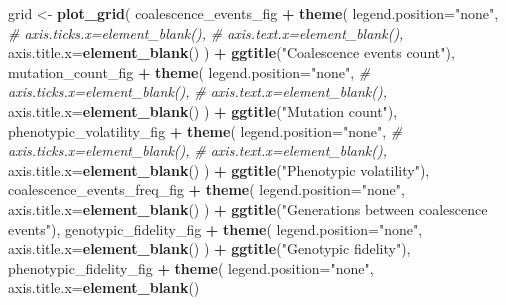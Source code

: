 \documentclass[]{book}
\newenvironment{Shaded}{\begin{snugshade}}{\end{snugshade}}
\newcommand{\CommentTok}[1]{\textcolor[rgb]{0.56,0.35,0.01}{\textit{#1}}}
\newcommand{\DataTypeTok}[1]{\textcolor[rgb]{0.13,0.29,0.53}{#1}}
\newcommand{\KeywordTok}[1]{\textcolor[rgb]{0.13,0.29,0.53}{\textbf{#1}}}
\newcommand{\NormalTok}[1]{#1}
\newcommand{\OperatorTok}[1]{\textcolor[rgb]{0.81,0.36,0.00}{\textbf{#1}}}
\newcommand{\StringTok}[1]{\textcolor[rgb]{0.31,0.60,0.02}{#1}}
\begin{document}
\begin{Shaded}
\begin{Highlighting}[]
\NormalTok{grid <-}\StringTok{ }\KeywordTok{plot_grid}\NormalTok{(}
\NormalTok{  coalescence_events_fig }\OperatorTok{+}
\StringTok{    }\KeywordTok{theme}\NormalTok{(}
      \DataTypeTok{legend.position=}\StringTok{"none"}\NormalTok{,}
      \CommentTok{# axis.ticks.x=element_blank(),}
      \CommentTok{# axis.text.x=element_blank(),}
      \DataTypeTok{axis.title.x=}\KeywordTok{element_blank}\NormalTok{()}
\NormalTok{    ) }\OperatorTok{+}
\StringTok{    }\KeywordTok{ggtitle}\NormalTok{(}\StringTok{"Coalescence events count"}\NormalTok{),}
\NormalTok{  mutation_count_fig }\OperatorTok{+}
\StringTok{    }\KeywordTok{theme}\NormalTok{(}
      \DataTypeTok{legend.position=}\StringTok{"none"}\NormalTok{,}
      \CommentTok{# axis.ticks.x=element_blank(),}
      \CommentTok{# axis.text.x=element_blank(),}
      \DataTypeTok{axis.title.x=}\KeywordTok{element_blank}\NormalTok{()}
\NormalTok{    ) }\OperatorTok{+}
\StringTok{    }\KeywordTok{ggtitle}\NormalTok{(}\StringTok{"Mutation count"}\NormalTok{),}
\NormalTok{  phenotypic_volatility_fig }\OperatorTok{+}
\StringTok{    }\KeywordTok{theme}\NormalTok{(}
      \DataTypeTok{legend.position=}\StringTok{"none"}\NormalTok{,}
      \CommentTok{# axis.ticks.x=element_blank(),}
      \CommentTok{# axis.text.x=element_blank(),}
      \DataTypeTok{axis.title.x=}\KeywordTok{element_blank}\NormalTok{()}
\NormalTok{    ) }\OperatorTok{+}
\StringTok{    }\KeywordTok{ggtitle}\NormalTok{(}\StringTok{"Phenotypic volatility"}\NormalTok{),}
\NormalTok{  coalescence_events_freq_fig }\OperatorTok{+}
\StringTok{    }\KeywordTok{theme}\NormalTok{(}
      \DataTypeTok{legend.position=}\StringTok{"none"}\NormalTok{,}
      \DataTypeTok{axis.title.x=}\KeywordTok{element_blank}\NormalTok{()}
\NormalTok{    ) }\OperatorTok{+}
\StringTok{    }\KeywordTok{ggtitle}\NormalTok{(}\StringTok{"Generations between coalescence events"}\NormalTok{),}
\NormalTok{  genotypic_fidelity_fig }\OperatorTok{+}
\StringTok{    }\KeywordTok{theme}\NormalTok{(}
      \DataTypeTok{legend.position=}\StringTok{"none"}\NormalTok{,}
      \DataTypeTok{axis.title.x=}\KeywordTok{element_blank}\NormalTok{()}
\NormalTok{    ) }\OperatorTok{+}
\StringTok{    }\KeywordTok{ggtitle}\NormalTok{(}\StringTok{"Genotypic fidelity"}\NormalTok{),}
\NormalTok{  phenotypic_fidelity_fig }\OperatorTok{+}
\StringTok{    }\KeywordTok{theme}\NormalTok{(}
      \DataTypeTok{legend.position=}\StringTok{"none"}\NormalTok{,}
      \DataTypeTok{axis.title.x=}\KeywordTok{element_blank}\NormalTok{()}

\end{Highlighting}
\end{Shaded}
\end{document}
